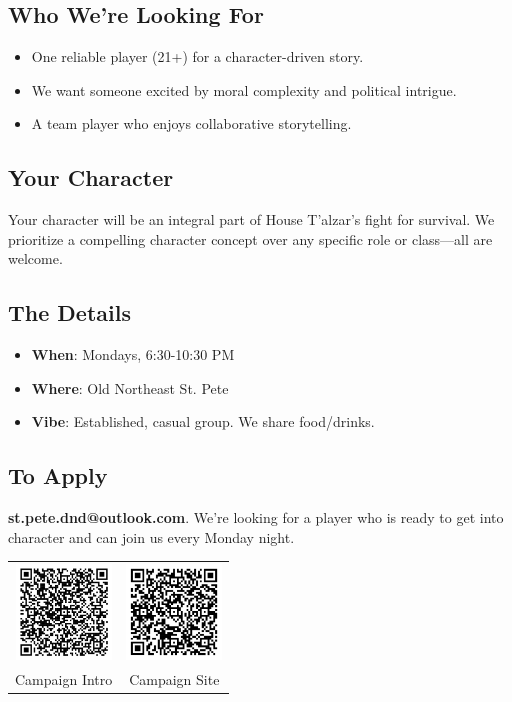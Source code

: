 \documentclass[a4paper, 8pt]{extarticle}
\begin{document}
\subsection*{\textbf{Who We're Looking For}}
\begin{itemize}
    \item One reliable player (21+) for a character-driven story.
    \item We want someone excited by moral complexity and political intrigue.
    \item A team player who enjoys collaborative storytelling.
\end{itemize}

\subsection*{\textbf{Your Character}}
Your character will be an integral part of House T’alzar’s fight for survival. We prioritize a compelling character concept over any specific role or class—all are welcome.

\subsection*{\textbf{The Details}}
\begin{itemize}
    \item \textbf{When}: Mondays, 6:30-10:30 PM
    \item \textbf{Where}: Old Northeast St. Pete
    \item \textbf{Vibe}: Established, casual group. We share food/drinks.
\end{itemize}

\subsection*{\textbf{To Apply}}
\textcolor{DragonRed}{\textbf{st.pete.dnd@outlook.com}}. We're looking for a player who is ready to get into character and can join us every Monday night.

\vspace{1cm}
\begin{table}[h!]
\centering
\begin{tabular}{cc}
\includegraphics[width=1in]{google_docs_qr_code_transparent.png} & \includegraphics[width=1in]{campaign_site_qr_code_transparent.png} \\
Campaign Intro & Campaign Site \\
\end{tabular}
\end{table}
\end{document}
